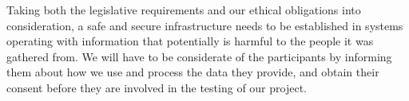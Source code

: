 
Taking both the legislative requirements and our ethical obligations into consideration, a safe and secure infrastructure needs to be established in systems operating with information that potentially is harmful to the people it was gathered from. We will have to be considerate of the participants by informing them about how we use and process the data they provide, and obtain their consent before they are involved in the testing of our project. 